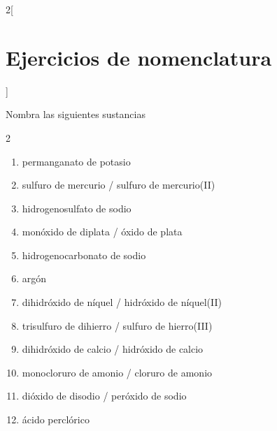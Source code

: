 \documentclass[10pt]{article}
\begin{document}
\begin{multicols*}{2}[
  \section{Ejercicios de nomenclatura}
  ]
\begin{exercise}[
    tags    = {inorgánica,nomenclatura,múltiple,2B},
    topics  = {química inorgánica,formulación,nomenclatura},
    source  = {Química 2B SAN 2016, p372, e7},
  ]
  Nombra las siguientes sustancias

  \begin{enumerate}\begin{multicols}{2}
    \item {}
    \item {}
    \item {}
    \item {}
    \item {}
    \item {}
    \item {}
    \item {}
    \item {}
    \item {}
    \item {}
    \item {}
  \end{multicols}\end{enumerate}
\end{exercise}

\begin{solution}
  \begin{enumerate}
    \item permanganato de potasio
    \item sulfuro de mercurio / sulfuro de mercurio(II)
    \item hidrogenosulfato de sodio
    \item monóxido de diplata / óxido de plata
    \item hidrogenocarbonato de sodio
    \item argón
    \item dihidróxido de níquel / hidróxido de níquel(II)
    \item trisulfuro de dihierro / sulfuro de hierro(III)
    \item dihidróxido de calcio / hidróxido de calcio
    \item monocloruro de amonio / cloruro de amonio
    \item dióxido de disodio / peróxido de sodio
    \item ácido perclórico
  \end{enumerate}
\end{solution}





\end{multicols*}
\end{document}
